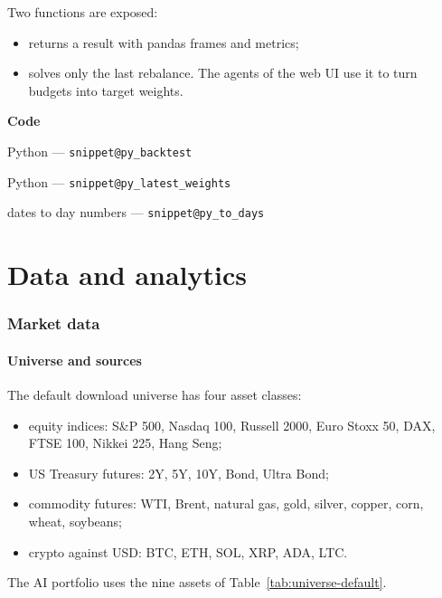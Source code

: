 \documentclass[11pt,a4paper]{article}
\makeatletter
\newcommand{\snippetsource}[1]{\csname snippet@#1\endcsname}
\newcommand{\snippet}[3]{%
  }
\newenvironment{codepointers}{%
  \par\smallskip\begingroup\footnotesize\noindent\textcolor{blue!50!black}{\textbf{Code}}\par\nopagebreak
  \begin{list}{}{\setlength{\leftmargin}{1.2em}\setlength{\itemsep}{0pt}\setlength{\parsep}{0pt}\setlength{\topsep}{1pt}}}%
  {\end{list}\endgroup\smallskip}
\newcommand{\codeitem}[2]{\item #2 --- \texttt{\snippetsource{#1}}}
\makeatother
\begin{document}
Two functions are exposed:
\begin{itemize}
  \item {} returns a result with
        pandas frames and metrics;
  \item {} solves only the last rebalance. The agents of
        the web UI use it to turn budgets into target weights.
\end{itemize}
\snippet{py_backtest_inputs}{Python}{pandas to C++}
\begin{codepointers}
  \codeitem{py_backtest}{Python }
  \codeitem{py_latest_weights}{Python }
  \codeitem{py_to_days}{dates to day numbers}
\end{codepointers}

\part{Data and analytics}

\section{Market data}\label{sec:marketdata}

\subsection{Universe and sources}
The default download universe has four asset classes:
\begin{itemize}
  \item equity indices: S\&P 500, Nasdaq 100, Russell 2000, Euro Stoxx 50, DAX, FTSE 100,
        Nikkei 225, Hang Seng;
  \item US Treasury futures: 2Y, 5Y, 10Y, Bond, Ultra Bond;
  \item commodity futures: WTI, Brent, natural gas, gold, silver, copper, corn, wheat,
        soybeans;
  \item crypto against USD: BTC, ETH, SOL, XRP, ADA, LTC.
\end{itemize}
The AI portfolio uses the nine assets of Table~\ref{tab:universe-default}.
\end{document}
